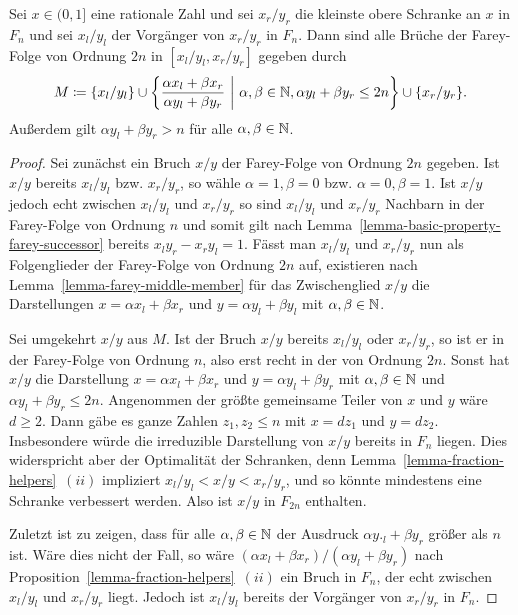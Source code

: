 \begin{lemma}\label{lemma-candidates-next-farey-bound}
	Sei $x\in(0,1]$ eine rationale Zahl und sei $x_r/y_r$ die kleinste obere Schranke an $x$ in $F_n$ und sei $x_l/y_l$ der Vorgänger von $x_r/y_r$ in $F_n$.
	Dann sind alle Brüche der Farey-Folge von Ordnung $2n$ in $[x_l/y_l, x_r/y_r]$ gegeben durch
	\[
		M\coloneq \{ x_l/y_l \} \cup \left\{ \frac{\alpha x_l + \beta x_r}{\alpha y_l + \beta y_r} ~\middle\vert~ \alpha,\beta\in\mathbb{N}, \alpha y_l + \beta y_r\leq 2n \right\} \cup \{ x_r/y_r \}.
	\]
	Außerdem gilt $\alpha y_l + \beta y_r > n$ für alle $\alpha,\beta \in\mathbb{N}$.
\end{lemma}
\begin{proof}
	Sei zunächst ein Bruch $x/y$ der Farey-Folge von Ordnung $2n$ gegeben.
	Ist $x/y$ bereits $x_l/y_l$ bzw. $x_r/y_r$, so wähle $\alpha = 1, \beta = 0$ bzw. $\alpha = 0, \beta = 1$.
	Ist $x/y$ jedoch echt zwischen $x_l/y_l$ und $x_r/y_r$ so sind $x_l/y_l$ und $x_r/y_r$ Nachbarn in der Farey-Folge von Ordnung $n$ und somit gilt nach Lemma~\ref{lemma-basic-property-farey-successor} bereits $x_ly_r - x_ry_l = 1$.
	Fässt man $x_l/y_l$ und $x_r/y_r$ nun als Folgenglieder der Farey-Folge von Ordnung $2n$ auf, existieren nach Lemma~\ref{lemma-farey-middle-member} für das Zwischenglied $x/y$ die Darstellungen $x = \alpha x_l + \beta x_r$ und $y= \alpha y_l + \beta y_l$ mit $\alpha, \beta \in\mathbb{N}$.
	
	Sei umgekehrt $x/y$ aus $M$.
	Ist der Bruch $x/y$ bereits $x_l/y_l$ oder $x_r/y_r$, so ist er in der Farey-Folge von Ordnung $n$, also erst recht in der von Ordnung $2n$.
	Sonst hat $x/y$ die Darstellung $x=\alpha x_l + \beta x_r$ und $y=\alpha y_l + \beta y_r$ mit $\alpha,\beta\in\mathbb{N}$ und $\alpha y_l + \beta y_r \leq 2n$.
	Angenommen der größte gemeinsame Teiler von $x$ und $y$ wäre $d\geq 2$.
	Dann gäbe es ganze Zahlen $z_1, z_2 \leq n$ mit $x=d z_1$ und $y=d z_2$.
	Insbesondere würde die irreduzible Darstellung von $x/y$ bereits in $F_n$ liegen.
	Dies widerspricht aber der Optimalität der Schranken, denn Lemma~\ref{lemma-fraction-helpers}~$(ii)$ impliziert $x_l / y_l < x/y < x_r/y_r$, und so könnte mindestens eine Schranke verbessert werden.
	Also ist $x/y$ in $F_{2n}$ enthalten.
	
	Zuletzt ist zu zeigen, dass für alle $\alpha,\beta\in\mathbb{N}$ der Ausdruck $\alpha y._l + \beta y_r$ größer als $n$ ist.
	Wäre dies nicht der Fall, so wäre $(\alpha x_l + \beta x_r) / (\alpha y_l + \beta y_r)$ nach Proposition~\ref{lemma-fraction-helpers}~$(ii)$ ein Bruch in $F_n$, der echt zwischen $x_l/y_l$ und $x_r/y_r$ liegt.
	Jedoch ist $x_l/y_l$ bereits der Vorgänger von $x_r/y_r$ in $F_n$.
\end{proof}

